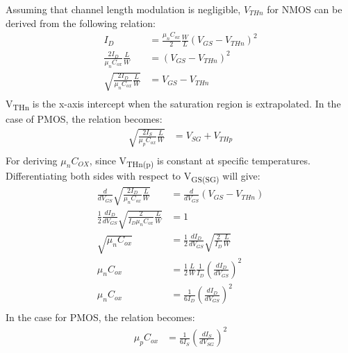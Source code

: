 \documentclass{article}
\begin{document}
\begin{enumerate}
Assuming that channel length modulation is negligible, \(V_{THn}\) for NMOS can be derived
from the following relation:
\begin{equation*}
\begin{aligned}
I_{D} &= \frac{\mu_{n}C_{ox}}{2} \frac{W}{L} (V_{GS} - V_{THn})^2 \\
\frac{2 I_{D}}{\mu_{n}C_{ox}}\frac{L}{W} &=  (V_{GS} - V_{THn})^2 \\
\sqrt{\frac{2 I_{D}}{\mu_{n}C_{ox}}\frac{L}{W}} &=  V_{GS} - V_{THn} \\
\end{aligned}
\end{equation*}
V\textsubscript{THn} is the x-axis intercept when the saturation region is extrapolated.
In the case of PMOS, the relation becomes:
\begin{equation*}
\begin{aligned}
\sqrt{\frac{2 I_{S}}{\mu_{p}C_{ox}}\frac{L}{W}} &=  V_{SG} + V_{THp} \\
\end{aligned}
\end{equation*}
For deriving \(\mu_{n}C_{OX}\), since V\textsubscript{THn(p)} is constant at specific temperatures.
Differentiating both sides with respect to V\textsubscript{GS(SG)} will give:
\begin{equation*}
\begin{aligned}
\frac{d}{dV_{GS}}\sqrt{\frac{2 I_{D}}{\mu_{n}C_{ox}}\frac{L}{W}} &=  \frac{d}{dV_{GS}}(V_{GS} - V_{THn}) \\
\frac{1}{2} \frac{dI_{D}}{dV_{GS}} \sqrt{\frac{2}{I_{D}\mu_{n}C_{ox}}\frac{L}{W}} &=  1 \\
\sqrt{\mu_{n}C_{ox}} &= \frac{1}{2} \frac{dI_{D}}{dV_{GS}} \sqrt{\frac{2}{I_{D}}\frac{L}{W}} \\
\mu_{n}C_{ox} &= \frac{1}{2} \frac{L}{W} \frac{1}{I_{D}}(\frac{dI_{D}}{dV_{GS}})^{2} \\
\mu_{n}C_{ox} &= \frac{1}{6 I_{D}}(\frac{dI_{D}}{dV_{GS}})^{2} \\
\end{aligned}
\end{equation*}
In the case for PMOS, the relation becomes:
\begin{equation*}
\begin{aligned}
\mu_{p}C_{ox} &= \frac{1}{6 I_{S}}(\frac{dI_{S}}{dV_{SG}})^{2} \\
\end{aligned}
\end{equation*}


\end{enumerate}
\end{document}
